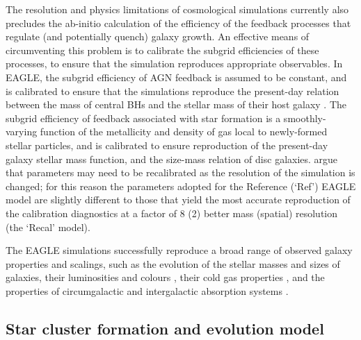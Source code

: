 \documentclass[fleqn,usenatbib]{mnras}
\begin{document}
The resolution and physics limitations of  cosmological simulations currently also precludes the ab-initio calculation of the efficiency of the feedback processes that regulate (and potentially quench) galaxy growth. An effective means of circumventing this problem is to calibrate the subgrid efficiencies of these processes, to ensure that the simulation reproduces appropriate observables. In EAGLE, the subgrid efficiency of AGN feedback is assumed to be constant, and is calibrated to ensure that the simulations reproduce the present-day relation between the mass of central BHs and the stellar mass of their host galaxy \citep[see also][]{Booth_and_Schaye_09}. The subgrid efficiency of feedback associated with star formation is a smoothly-varying function of the metallicity and density of gas local to newly-formed stellar particles, and is calibrated to ensure reproduction of the present-day galaxy stellar mass function, and the size-mass relation of disc galaxies.  argue that parameters may need to be recalibrated as the resolution of the simulation is changed; for this reason the parameters adopted for the Reference (`Ref') EAGLE model are slightly different to those that yield the most accurate reproduction of the calibration diagnostics at a factor of 8 (2) better mass (spatial) resolution (the `Recal' model). 

The EAGLE simulations successfully reproduce a broad range of observed galaxy properties and scalings, such as the evolution of the stellar masses \citep{Furlong_et_al_15_short} and sizes \citep{Furlong_et_al_17} of galaxies, their luminosities and colours \citep{Trayford_et_al_15_short}, their cold gas properties \citep{Lagos_et_al_15_short,Lagos_et_al_16,Bahe_et_al_16,Marasco_et_al_16,Crain_et_al_17}, and the properties of circumgalactic and intergalactic absorption systems \citep{Rahmati_et_al_15,Oppenheimer_et_al_16,Rahmati_et_al_16,Turner_et_al_16,Turner_et_al_17}.


\subsection{Star cluster formation and evolution model}
\label{sec:mosaics}
\end{document}
